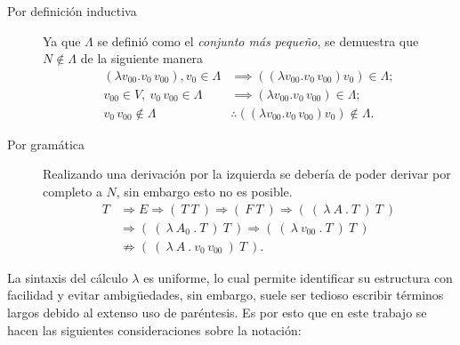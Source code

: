 \begin{description}
\item[Por definición inductiva] Ya que \( Λ \) se definió como el \emph{conjunto más pequeño}, se demuestra que \( N \not\in Λ \) de la siguiente manera
  \begin{align*}
    (λv_{00}.v_{0}\, v_{00}), v_{0} \in Λ &\implies ((λv_{00}.v_{0}\, v_{00}) v_{0}) \in Λ; \\
    v_{00} \in V,\ v_{0}\, v_{00} \in Λ &\implies (λv_{00}.v_{0}\, v_{00}) \in Λ; \\
    v_{0}\, v_{00} \not\in Λ &\therefore ((λv_{00}.v_{0}\, v_{00}) v_{0}) \not\in Λ.
  \end{align*}
\item[Por gramática] Realizando una derivación por la izquierda se debería de poder derivar por completo a \( N \), sin embargo esto no es posible.
  \begin{align*}
    T &\Rightarrow E \Rightarrow (\ T\ T\ ) \Rightarrow (\ F\ T\ ) \Rightarrow (\ (\ λ\ A\ .\ T\ )\ T\ ) \\
      &\Rightarrow (\ (\ λ\ A_{0}\ .\ T\ )\ T\ ) \Rightarrow (\ (\ λ\ v_{00}\ .\ T\ )\ T\ ) \\
      &\nRightarrow (\ (\ λ\ A\ .\ v_{0}\, v_{00}\ )\ T\ ).
  \end{align*}
\end{description}

La sintaxis del cálculo \( λ \) es uniforme, lo cual permite identificar su estructura con facilidad y evitar ambigüedades, sin embargo, suele ser tedioso escribir términos largos debido al extenso uso de paréntesis. Es por esto que en este trabajo se hacen las siguientes consideraciones sobre la notación:


